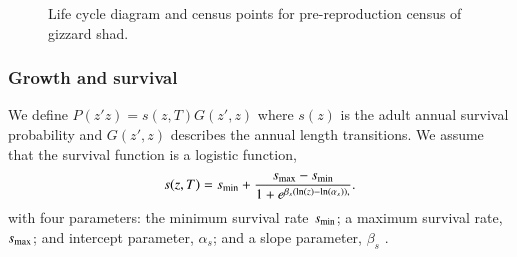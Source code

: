 \documentclass[preprint,review,12pt,authoryear]{elsarticle}
\begin{document}
\begin{figure}
\begin{center}
\end{center}
 \caption{\small{Life cycle diagram and census points for pre-reproduction census of gizzard shad.}}
\end{figure}

\subsubsection{Growth and survival}
We define $P(z'z) = s(z,T)G(z',z)$ where $s(z)$ is the adult annual survival probability and $G(z',z)$ describes the annual length transitions. We assume that the survival function is a logistic function,
\begin{equation}\label{eq:surv}
s(z,T) = s_{\rm min} + \frac{s_{\rm max}-s_{\rm min}}{1+e^{\beta_s(\ln(z)-\ln(\alpha_s)),}}.
\end{equation}
with four parameters: the minimum survival rate $s_{\rm min}$; a maximum survival rate, $s_{\rm max}$; and intercept parameter, $\alpha_{s}$; and a slope parameter, $\beta_{s}$ \citep{bolker2008ecological}.  
\end{document}
